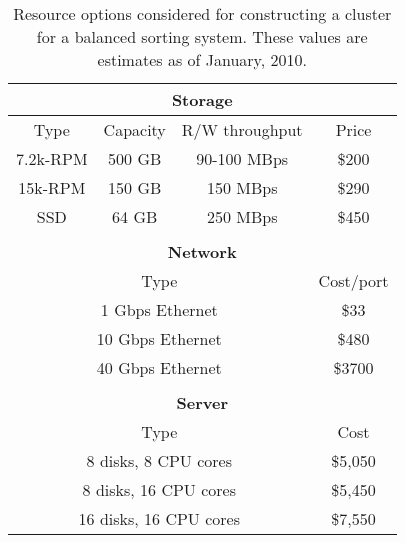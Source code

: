 \begin{table}[t]
\caption{Resource options considered for constructing a cluster for a
  balanced sorting system.  These values are estimates as of January, 2010.}
\label{tab:resourcesummary}
\begin{center}
\begin{tabular}{|c|c|c|c|}
\hline
\multicolumn{4}{|c|}{{\bf Storage}}\\
\hline
Type & Capacity & R/W throughput & Price\\
\hline
7.2k-RPM & 500 GB & 90-100 MBps & \$200\\
\hline
15k-RPM & 150 GB & 150 MBps & \$290\\
\hline
SSD     & 64 GB  & 250 MBps & \$450\\
\hline
\multicolumn{4}{c}{}\\
\hline
\multicolumn{4}{|c|}{{\bf Network}}\\
\hline
\multicolumn{3}{|c|}{Type} & Cost/port\\
\hline
\multicolumn{3}{|c|}{1 Gbps Ethernet} & \$33\\
\hline
\multicolumn{3}{|c|}{10 Gbps Ethernet} & \$480\\
\hline
\multicolumn{3}{|c|}{40 Gbps Ethernet} & \$3700\\
\hline
\multicolumn{4}{c}{}\\
\hline
\multicolumn{4}{|c|}{{\bf Server}}\\
\hline
\multicolumn{3}{|c|}{Type} & Cost\\
\hline
\multicolumn{3}{|c|}{8 disks, 8 CPU cores} & \$5,050\\
\hline
\multicolumn{3}{|c|}{8 disks, 16 CPU cores} & \$5,450\\
\hline
\multicolumn{3}{|c|}{16 disks, 16 CPU cores} & \$7,550\\
\hline
\end{tabular}
\end{center}
\end{table}

